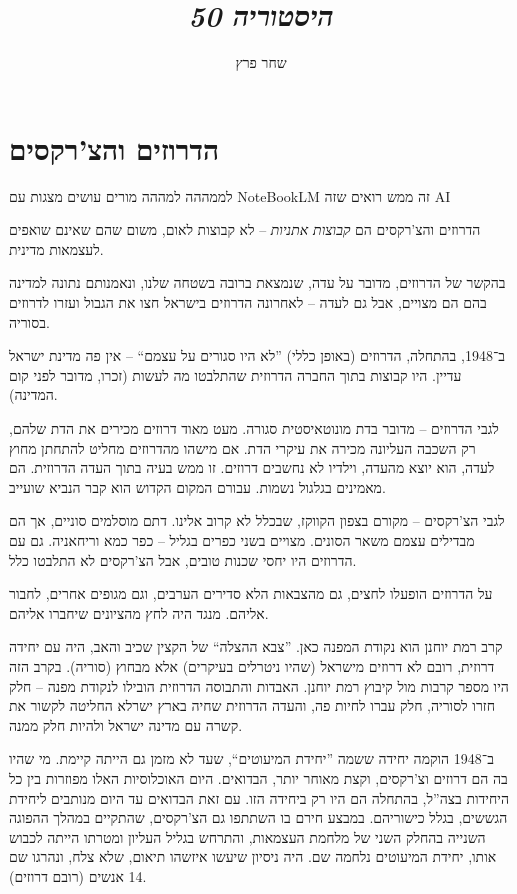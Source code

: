 \documentclass[]{../../../../tex/classes/styledArticle}
\author{שחר פרץ}
\title{\textit{היסטוריה 50}}
\begin{document}
	\maketitle
	\section*{הדרוזים והצ'רקסים}
	לממההה למההה מורים עושים מצגות עם NoteBookLM זה ממש רואים שזה AI
	
	הדרוזים והצ'רקסים הם \textit{קבוצות אתניות} – לא קבוצות לאום, משום שהם שאינם שואפים לעצמאות מדינית. 
	
	בהקשר של הדרוזים, מדובר על עדה, שנמצאת ברובה בשטחה שלנו, ונאמנותם נתונה למדינה בהם הם מצויים, אבל גם לעדה – לאחרונה הדרוזים בישראל חצו את הגבול ועזרו לדרוזים בסוריה. 
	
	ב־1948, בהתחלה, הדרוזים (באופן כללי) ''לא היו סגורים על עצמם`` – אין פה מדינת ישראל עדיין. היו קבוצות בתוך החברה הדרוזית שהתלבטו מה לעשות (זכרו, מדובר לפני קום המדינה). 
	
	לגבי הדרוזים – מדובר בדת מונוטאיסטית סגורה. מעט מאוד דרוזים מכירים את הדת שלהם, רק השכבה העליונה מכירה את עיקרי הדת. אם מישהו מהדרוזים מחליט להתחתן מחוץ לעדה, הוא יוצא מהעדה, וילדיו לא נחשבים דרוזים. זו ממש בעיה בתוך העדה הדרוזית. הם מאמינים בגלגול נשמות. עבורם המקום הקדוש הוא קבר הנביא שועייב. 
	
	לגבי הצ'רקסים – מקורם בצפון הקווקז, שבכלל לא קרוב אלינו. דתם מוסלמים סוניים, אך הם מבדילים עצמם משאר הסונים. מצויים בשני כפרים בגליל – כפר כמא וריחאניה. גם עם הדרוזים היו יחסי שכנות טובים, אבל הצ'רקסים לא התלבטו כלל. 
	
	על הדרוזים הופעלו לחצים, גם מהצבאות הלא סדירים הערבים, וגם מגופים אחרים, לחבור אליהם. מנגד היה לחץ מהציונים שיחברו אליהם. 
	
	קרב רמת יוחנן הוא נקודת המפנה כאן. ''צבא ההצלה`` של הקצין שכיב והאב, היה עם יחידה דרוזית, רובם לא דרוזים מישראל (שהיו ניטרלים בעיקרים) אלא מבחוץ (סוריה). בקרב הזה היו מספר קרבות מול קיבוץ רמת יוחנן. האבדות והתבוסה הדרוזית הובילו לנקודת מפנה – חלק חזרו לסוריה, חלק עברו לחיות פה, והעדה הדרוזית שחיה בארץ ישרלא החליטה לקשור את קשרה עם מדינה ישראל ולהיות חלק ממנה. 
	
	ב־1948 הוקמה יחידה ששמה ''יחידת המיעוטים``, שעד לא מזמן גם הייתה קיימת. מי שהיו בה הם דרוזים וצ'רקסים, וקצת מאוחר יותר, הבדואים. היום האוכלוסיות האלו מפוזרות בין כל היחידות בצה''ל, בהתחלה הם היו רק ביחידה הזו. עם זאת הבדואים עד היום מנותבים ליחידת הגששים, בגלל כישוריהם. במבצע חירם בו השתתפו גם הצ'רקסים, שהתקיים במהלך ההפוגה השנייה בהחלק השני של מלחמת העצמאות, והתרחש בגליל העליון ומטרתו הייתה לכבוש אותו, יחידת המיעוטים נלחמה שם. היה ניסיון שיעשו איזשהו תיאום, שלא צלח, ונהרגו שם 14 אנשים (רובם דרוזים). 
	
\end{document}

